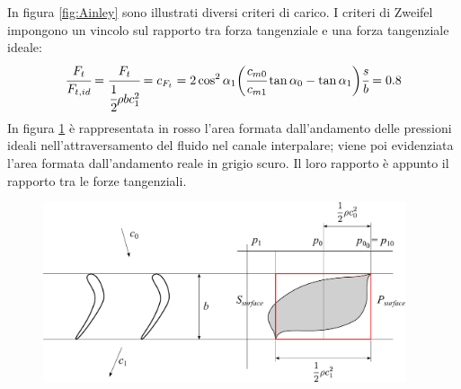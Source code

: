 In figura \ref{fig:Ainley} sono illustrati diversi criteri di carico. I criteri di Zweifel impongono un vincolo sul rapporto tra forza tangenziale e una forza tangenziale ideale:
\begin{align*}
\cfrac{F_t}{F_{t,id}} = \cfrac{F_t}{\cfrac{1}{2} \rho b c_1^2} = c_{F_t} = 2 \cos^2 \alpha_1 \bigg(\cfrac{c_{m0}}{c_{m1}} \tan \alpha_0 - \tan \alpha_1 \bigg) \cfrac{s}{b} = 0.8
\end{align*}
In figura \ref{fig:CritCaricoT} è rappresentata in rosso l'area formata dall'andamento delle pressioni ideali nell'attraversamento del fluido nel canale interpalare; viene poi evidenziata l'area formata dall'andamento reale in grigio scuro. Il loro rapporto è appunto il rapporto tra le forze tangenziali.
\begin{figure}[h!]
\centering
  \includegraphics[width=0.95\textwidth]{fig/CritCaricoT.pdf}
\caption{}
\label{fig:CritCaricoT}
\end{figure}